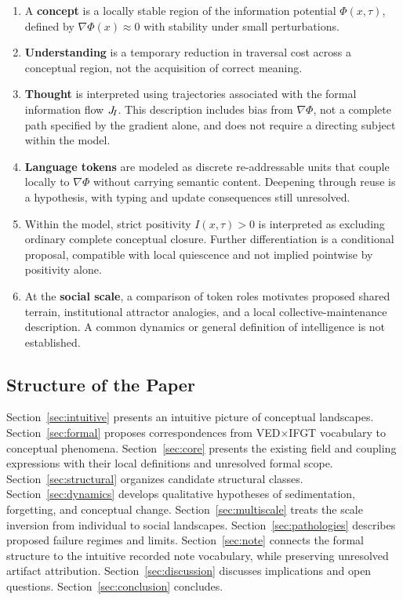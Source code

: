 \begin{enumerate}
  \item A \textbf{concept} is a locally stable region of the information
        potential $\Phi(x,\tau)$, defined by $\nabla\Phi(x)\approx 0$
        with stability under small perturbations.

  \item \textbf{Understanding} is a temporary reduction in traversal cost
        across a conceptual region, not the acquisition of correct meaning.

  \item \textbf{Thought} is interpreted using trajectories associated with
        the formal information flow $J_{\!I}$. This description includes bias
        from $\nabla\Phi$, not a complete path specified by the gradient
        alone, and does not require a directing subject within the model.

  \item \textbf{Language tokens} are modeled as discrete re-addressable units
        that couple locally to $\nabla\Phi$ without carrying semantic
        content. Deepening through reuse is a hypothesis, with typing
        and update consequences still unresolved.

  \item Within the model, strict positivity $I(x,\tau)>0$ is interpreted
        as excluding ordinary complete conceptual closure. Further
        differentiation is a conditional proposal, compatible with local
        quiescence and not implied pointwise by positivity alone.

  \item At the \textbf{social scale}, a comparison of token roles motivates
        proposed shared terrain, institutional attractor analogies, and
        a local collective-maintenance description. A common dynamics or
        general definition of intelligence is not established.
\end{enumerate}

\subsection{Structure of the Paper}

Section~\ref{sec:intuitive} presents an intuitive picture of conceptual
landscapes.
Section~\ref{sec:formal} proposes correspondences from VED$\times$IFGT
vocabulary to conceptual phenomena.
Section~\ref{sec:core} presents the existing field and coupling expressions
with their local definitions and unresolved formal scope.
Section~\ref{sec:structural} organizes candidate structural classes.
Section~\ref{sec:dynamics} develops qualitative hypotheses of sedimentation,
forgetting, and conceptual change.
Section~\ref{sec:multiscale} treats the scale inversion from individual
to social landscapes.
Section~\ref{sec:pathologies} describes proposed failure regimes and limits.
Section~\ref{sec:note} connects the formal structure to the intuitive
recorded note vocabulary, while preserving unresolved artifact attribution.
Section~\ref{sec:discussion} discusses implications and open questions.
Section~\ref{sec:conclusion} concludes.
